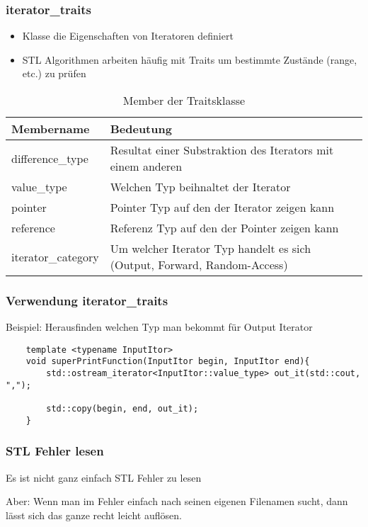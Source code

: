 \documentclass{beamer}
\begin{document}
\begin{frame}[<+->]\frametitle{iterator\_traits}
    \pause
    \begin{itemize}[<+->]
        \item Klasse die Eigenschaften von Iteratoren definiert
        \item STL Algorithmen arbeiten häufig mit Traits um bestimmte Zustände (range, etc.) zu prüfen
    \end{itemize}

    \pause
    \begin{table}[htb]
        \begin{tabular}{ | l | p{7cm} | }
            \hline
            Membername & Bedeutung \\ \hline \hline
            difference\_type & Resultat einer Substraktion des Iterators mit einem anderen \\ \hline
            value\_type & Welchen Typ beihnaltet der Iterator \\ \hline
            pointer & Pointer Typ auf den der Iterator zeigen kann \\ \hline
            reference & Referenz Typ auf den der Pointer zeigen kann \\ \hline
            iterator\_category & Um welcher Iterator Typ handelt es sich (Output, Forward, Random-Access) \\ \hline
        \end{tabular}
        \caption{Member der Traitsklasse\cite{cppRef}}\label{table:traitsMember}
    \end{table}

\end{frame}

\begin{frame}[fragile]\frametitle{Verwendung iterator\_traits}
    \pause
    Beispiel: Herausfinden welchen Typ man bekommt für Output Iterator
    \pause
    \begin{lstlisting}
	template <typename InputItor>
	void superPrintFunction(InputItor begin, InputItor end){
    	std::ostream_iterator<InputItor::value_type> out_it(std::cout, ",");

	    std::copy(begin, end, out_it);
	}
    \end{lstlisting}
\end{frame}

\begin{frame}[fragile]\frametitle{STL Fehler lesen}
    Es ist nicht ganz einfach STL Fehler zu lesen
    \begin{exampleblock}{Aber:}
    Wenn man im Fehler einfach nach seinen eigenen Filenamen sucht, dann lässt sich das ganze recht leicht auflösen.
    \end{exampleblock}
\end{frame}
\end{document}
